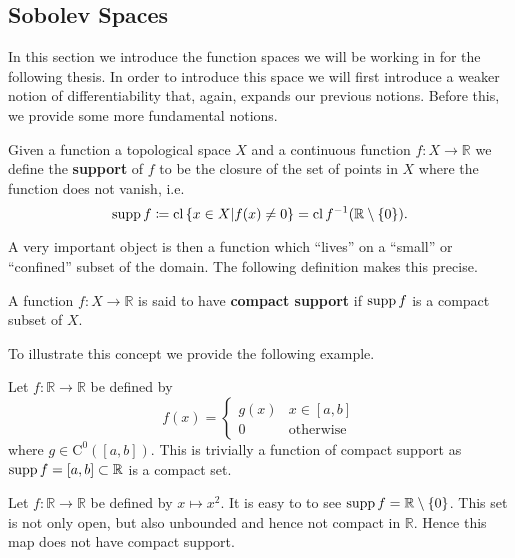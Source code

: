 \subsection{Sobolev Spaces}\label{subsec:weakds}
In this section we introduce the function spaces we will be working in for the
following thesis. In order to introduce this space we will first introduce a
weaker notion of differentiability that, again, expands our previous notions.
Before this, we provide some more fundamental notions.
\begin{definition}
    Given a function a topological space \(X\) and a continuous function
    \(f:X\to\mathbb{R}\) we define the \textbf{support} of \(f\) to be the
    closure of the set of points in \(X\) where the function does not vanish, i.e.
    \begin{equation}
        \operatorname{supp}{f}\coloneqq \operatorname{cl}{\{x\in X | f(x) \neq 0\}} = \operatorname{cl}{f^{-1}(\mathbb{R}\setminus\{0\})}.
    \end{equation}
\end{definition}
A very important object is then a function which ``lives'' on a ``small'' or
``confined'' subset of the domain. The following definition makes this precise.
\begin{definition}
    A function \(f:X\to\mathbb{R}\) is said to have \textbf{compact support} if
    \(\operatorname{supp}{f}\) is a compact subset of \(X\).
\end{definition}
To illustrate this concept we provide the following example.
\begin{example}
    Let \(f:\mathbb{R}\to\mathbb{R}\) be defined by
    \begin{equation}
        f(x) = \begin{cases}
            g(x) & x\in[a,b]        \\
            0    & \text{otherwise}
        \end{cases}
    \end{equation}
    where \(g\in\mathrm{C}^0([a,b])\). This is trivially a function of compact
    support as \(\operatorname{supp}{f} = [a,b]\subset\mathbb{R}\) is a compact set.
\end{example}

\begin{example}
    Let \(f:\mathbb{R}\to\mathbb{R}\) be defined by \(x\mapsto x^2\). It is easy
    to to see \(\operatorname{supp}{f} = \mathbb{R}\setminus \{0\}\). This set is not only
    open, but also unbounded and hence not compact in \(\mathbb{R}\). Hence this
    map does not have compact support.
\end{example}

